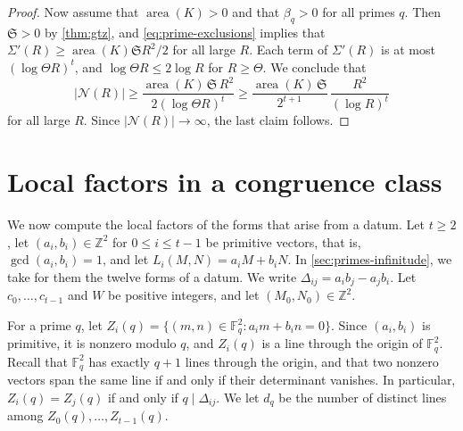 \documentclass[12pt,oneside,openany]{book}
\theoremstyle{definition}
\theoremstyle{plain}
\numberwithin{equation}{chapter}
\theoremstyle{plain}
\theoremstyle{definition}
\theoremstyle{remark}
\newcommand{\Z}{\mathbb Z}
\newcommand{\F}{\mathbb F}
\DeclareMathOperator{\area}{area}
\begin{document}
\begin{proof}
Now assume that $\area(K)>0$ and that $\beta_q>0$ for all primes $q$. Then $\mathfrak S>0$ by \cref{thm:gtz}, and \eqref{eq:prime-exclusions} implies that $\Sigma'(R)\ge\area(K)\mathfrak S R^2/2$ for all large $R$. Each term of $\Sigma'(R)$ is at most $(\log\Theta R)^t$, and $\log\Theta R\le2\log R$ for $R\ge\Theta$. We conclude that
\[
|\mathcal N(R)|\ge\frac{\area(K)\,\mathfrak S\,R^2}{2(\log\Theta R)^t}\ge\frac{\area(K)\,\mathfrak S}{2^{t+1}}\,\frac{R^2}{(\log R)^t}
\]
for all large $R$. Since $|\mathcal N(R)|\to\infty$, the last claim follows.
\end{proof}

\section{Local factors in a congruence class}\label{sec:primes-local}

We now compute the local factors of the forms that arise from a datum. Let $t\ge2$, let $(a_i,b_i)\in\Z^2$ for $0\le i\le t-1$ be primitive vectors, that is, $\gcd(a_i,b_i)=1$, and let $L_i(M,N)=a_iM+b_iN$. In \cref{sec:primes-infinitude}, we take for them the twelve forms of a datum. We write $\Delta_{ij}=a_ib_j-a_jb_i$. Let $c_0,\dots,c_{t-1}$ and $W$ be positive integers, and let $(M_0,N_0)\in\Z^2$.

For a prime $q$, let $Z_i(q)=\{(m,n)\in\F_q^2:a_im+b_in=0\}$. Since $(a_i,b_i)$ is primitive, it is nonzero modulo $q$, and $Z_i(q)$ is a line through the origin of $\F_q^2$. Recall that $\F_q^2$ has exactly $q+1$ lines through the origin, and that two nonzero vectors span the same line if and only if their determinant vanishes. In particular, $Z_i(q)=Z_j(q)$ if and only if $q\mid\Delta_{ij}$. We let $d_q$ be the number of distinct lines among $Z_0(q),\dots,Z_{t-1}(q)$.
\end{document}

